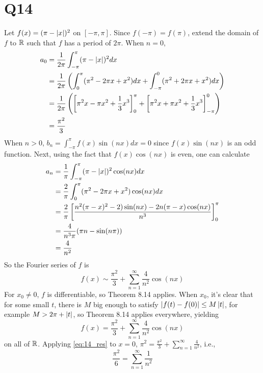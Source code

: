 \documentclass[12pt]{article}
\begin{document}
\section*{Q14}
Let $f(x) = (\pi - \left|x\right|)^2$ on $[-\pi, \pi]$. 
Since $f(-\pi) = f(\pi)$, extend the domain of $f$ to $\mathbb{R}$ such that $f$ has a period of $2\pi$. 
When $n = 0$, 
\begin{align*}
  a_0 & = \frac{1}{2\pi} \int_{-\pi}^{\pi} (\pi - \left|x\right|)^2 dx \\ 
      & = \frac{1}{2\pi} \left( \int_{0}^{\pi} (\pi^2 - 2\pi x + x^2) dx + \int_{-\pi}^{0} (\pi^2 + 2\pi x + x^2)dx \right)\\ 
      & = \frac{1}{2\pi} \left( \left[ \pi^2 x - \pi x^2 + \frac{1}{3}x^3 \right]_{0}^{\pi} + \left[ \pi^2 x + \pi x^2 + \frac{1}{3}x^3 \right]_{-\pi}^{0} \right)\\ 
      & = \frac{\pi^2}{3}
\end{align*}
When $n > 0$, $b_n = \int_{-\pi}^{\pi} f(x) \sin(nx)dx = 0$ since $f(x)\sin(nx)$ is an odd function. 
Next, using the fact that $f(x) \cos(nx)$ is even, one can calculate  
\begin{align*}
  a_n & = \frac{1}{\pi} \int_{-\pi}^{\pi} (\pi - \left|x\right|)^2 \cos(nx) dx \\ 
      & = \frac{2}{\pi} \int_{0}^{\pi} (\pi^2 - 2\pi x + x^2)\cos(nx)dx \\  
      & = \frac{2}{\pi} \left[ \frac{n^2 (\pi - x)^2 - 2)\sin(nx) - 2n(\pi - x)\cos(nx)}{n^3} \right]_{0}^{\pi}  \\ 
      & = \frac{4}{n^3 \pi} (\pi n - \sin(n\pi)) \\ 
      & = \frac{4}{n^2}
\end{align*}
So the Fourier series of $f$ is 
$$f(x) \sim \frac{\pi^2}{3} + \sum_{n = 1}^{\infty} \frac{4}{n^2} \cos(nx)$$
For $x_0 \neq 0$, $f$ is differentiable, so Theorem 8.14 applies. 
When $x_0$, it's clear that for some small $t$, there is $M$ big enough to satisfy $\left|f(t) - f(0)\right| \leq M\left|t\right|$, for example $M > 2\pi + \left|t\right|$, so Theorem 8.14 applies everywhere, yielding 
\begin{equation} \label{eq:14_res}
  f(x) = \frac{\pi^2}{3} + \sum_{n = 1}^{\infty} \frac{4}{n^2}\cos(nx)
\end{equation}
on all of $\mathbb{R}$. 
Applying \eqref{eq:14_res} to $x = 0$, $\pi^2 = \frac{\pi^2}{3} + \sum_{n = 1}^{\infty} \frac{4}{n^2}$, i.e., 
$$\frac{\pi^2}{6} = \sum_{n = 1}^{\infty} \frac{1}{n^2}$$
\end{document}
